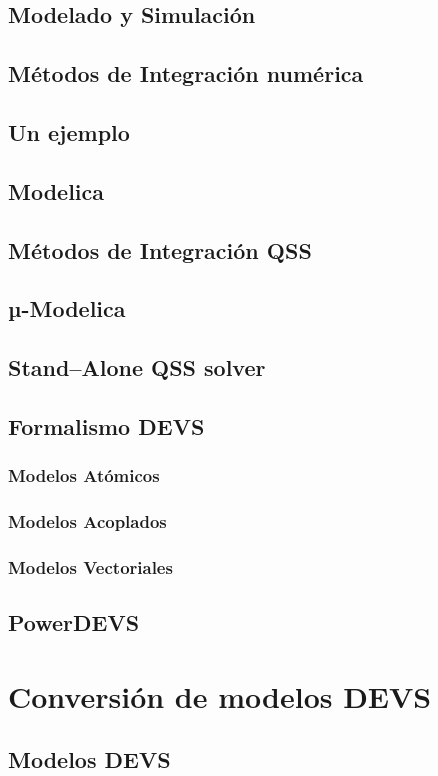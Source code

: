 	\subsection{Modelado y Simulación}
	\subsection{Métodos de Integración numérica}
	\subsection{Un ejemplo}
	\subsection{Modelica}
	\subsection{Métodos de Integración QSS}
	\subsection{µ-Modelica}
	\subsection{Stand–Alone QSS solver}
	\subsection{Formalismo DEVS}
		\subsubsection{Modelos Atómicos}
		\subsubsection{Modelos Acoplados}
		\subsubsection{Modelos Vectoriales}
	\subsection{PowerDEVS}
\section{Conversión de modelos DEVS}
	\subsection{Modelos DEVS}

